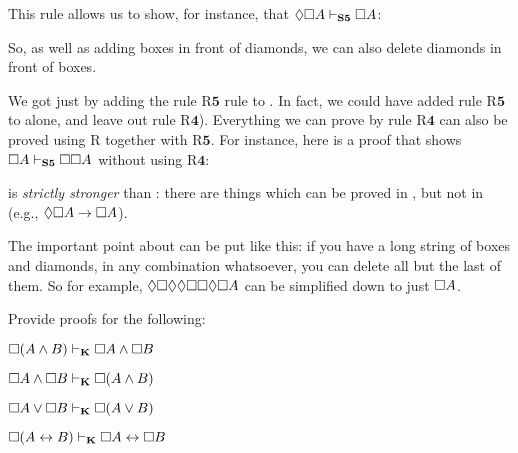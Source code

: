 This rule allows us to show, for instance, that $\Diamond\Box A\vdash_{\mathbf{S5}}  \Box A$:
\begin{fitchproof}
	\PR
	\open
	\AS
	\open
	\AS
	\close
	\close
\end{fitchproof}

So, as well as adding boxes in front of diamonds, we can also delete diamonds in front of boxes.

We got \mlSfive{} just by adding the rule R$\mathbf{5}$ rule to \mlSfour. In fact, we could have added rule R$\mathbf{5}$ to \mlT{} alone, and leave out rule R$\mathbf{4}$). Everything we can prove by rule R$\mathbf{4}$ can also be proved using R\mlT{} together with R$\mathbf{5}$. For instance, here is a proof that shows $\Box A \vdash_{\mathbf{S5}}  \Box\Box A$ without using R$\mathbf{4}$:
\begin{fitchproof}
	\PR
	\open
	\AS
	\close
	\open
	\AS
	\open
	\AS
	\open
	\AS
	\close
	\close
	\close
\end{fitchproof}
\mlSfive{} is \emph{strictly stronger} than \mlSfour: there are things which can be proved in \mlSfive, but not in \mlSfour{} (e.g., $\Diamond\Box A \rightarrow \Box A$).

The important point about \mlSfive{} can be put like this: if you have a long string of boxes and diamonds, in any combination whatsoever, you can delete all but the last of them. So for example, $\Diamond\Box\Diamond\Diamond\Box\Box\Diamond\Box A$ can be simplified down to just $\Box A$.

\practiceproblems

\problempart
Provide proofs for the following:
\begin{compactlist}
	\item $\Box (A\wedge B)\vdash_{\mathbf{K}}\Box A \wedge \Box B$
	\item $\Box A\wedge\Box B\vdash_{\mathbf{K}}\Box( A \wedge  B)$
	\item $\Box A\vee\Box B\vdash_{\mathbf{K}}\Box( A \vee  B)$
	\item $\Box (A \leftrightarrow B)\vdash_{\mathbf{K}} \Box A \leftrightarrow \Box B$
\end{compactlist}

